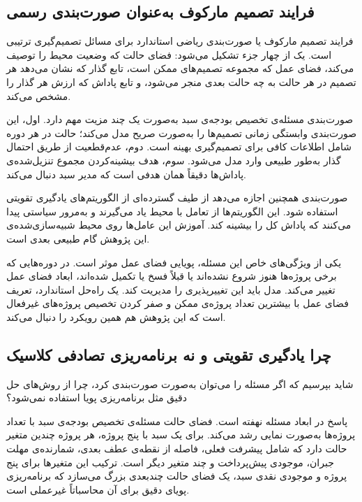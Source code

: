 \subsection{فرایند تصمیم مارکوف به‌عنوان صورت‌بندی رسمی}
\label{subsec:mdp_formulation_intro}

فرایند تصمیم مارکوف یا  صورت‌بندی ریاضی استاندارد برای
مسائل تصمیم‌گیری ترتیبی است. یک  از چهار جزء تشکیل می‌شود:
فضای حالت که وضعیت محیط را توصیف می‌کند، فضای عمل که مجموعه
تصمیم‌های ممکن است، تابع گذار که نشان می‌دهد هر تصمیم در هر حالت
به چه حالت بعدی منجر می‌شود، و تابع پاداش که ارزش هر گذار را مشخص
می‌کند.

صورت‌بندی مسئله‌ی تخصیص بودجه‌ی سبد به‌صورت یک  چند مزیت
مهم دارد. اول، این صورت‌بندی وابستگی زمانی تصمیم‌ها را به‌صورت
صریح مدل می‌کند؛ حالت در هر دوره شامل اطلاعات کافی برای تصمیم‌گیری
بهینه است. دوم، عدم‌قطعیت از طریق احتمال گذار به‌طور طبیعی وارد
مدل می‌شود. سوم، هدف بیشینه‌کردن مجموع تنزیل‌شده‌ی پاداش‌ها
دقیقاً همان هدفی است که مدیر سبد دنبال می‌کند.

صورت‌بندی  همچنین اجازه می‌دهد از طیف گسترده‌ای از
الگوریتم‌های یادگیری تقویتی استفاده شود. این الگوریتم‌ها از
تعامل با محیط یاد می‌گیرند و به‌مرور سیاستی پیدا می‌کنند که
پاداش کل را بیشینه کند. آموزش این عامل‌ها روی محیط شبیه‌سازی‌شده‌ی
این پژوهش گام طبیعی بعدی است.

یکی از ویژگی‌های خاص  این مسئله، پویایی فضای عمل موثر
است. در دوره‌هایی که برخی پروژه‌ها هنوز شروع نشده‌اند یا قبلاً
فسخ یا تکمیل شده‌اند، ابعاد فضای عمل تغییر می‌کند. مدل باید
این تغییرپذیری را مدیریت کند. یک راه‌حل استاندارد، تعریف فضای
عمل با بیشترین تعداد پروژه‌ی ممکن و صفر کردن تخصیص پروژه‌های
غیرفعال است که این پژوهش هم همین رویکرد را دنبال می‌کند.

\subsection{چرا یادگیری تقویتی و نه برنامه‌ریزی تصادفی کلاسیک}
\label{subsec:rl_vs_sp}

شاید بپرسیم که اگر مسئله را می‌توان به‌صورت  صورت‌بندی کرد،
چرا از روش‌های حل دقیق مثل برنامه‌ریزی پویا استفاده نمی‌شود؟

پاسخ در ابعاد مسئله نهفته است. فضای حالت مسئله‌ی تخصیص بودجه‌ی
سبد با تعداد پروژه‌ها به‌صورت نمایی رشد می‌کند. برای یک سبد با
پنج پروژه، هر پروژه چندین متغیر حالت دارد که شامل پیشرفت فعلی،
فاصله از نقطه‌ی عطف بعدی، شمارنده‌ی مهلت جبران، موجودی پیش‌پرداخت
و چند متغیر دیگر است. ترکیب این متغیرها برای پنج پروژه و موجودی
نقدی سبد، یک فضای حالت چندبعدی بزرگ می‌سازد که برنامه‌ریزی پویای
دقیق برای آن محاسباتاً غیرعملی است.

